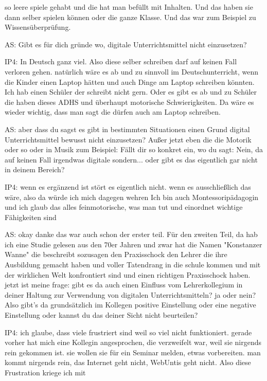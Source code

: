\documentclass[fontsize=11pt,paper=a4]{scrbook}
\begin{document}
{\begin{itemize*}
so leere spiele gehabt und die hat man befüllt mit Inhalten. Und das haben sie dann selber spielen können oder die
ganze Klasse. Und das war zum Beispiel zu
Wissensüberprüfung.
\item[AS:] Gibt es für dich gründe wo, digitale Unterrichtsmittel nicht einzusetzen?
\item[IP4:] In Deutsch ganz viel.  Also diese selber
schreiben  darf auf keinen Fall
verloren gehen.
natürlich wäre es ab und zu sinnvoll
im Deutschunterricht, wenn die
Kinder einen Laptop hätten und auch Dinge am Laptop schreiben könnten. Ich hab einen
Schüler der schreibt nicht gern. Oder es gibt es ab und zu Schüler die haben
dieses ADHS und überhaupt motorische
Schwierigkeiten. Da wäre es wieder wichtig, dass man sagt
 die dürfen auch am Laptop schreiben.
 \item[AS:] aber dass du sagst
es gibt in bestimmten Situationen einen Grund
digital Unterrichtsmittel bewusst nicht
einzusetzen? Außer jetzt eben
die die Motorik oder so oder in Musik zum Beispiel: Fällt dir so konkret ein, wo du sagt: Nein, da auf keinen Fall irgendwas digitale
sondern... oder gibt es das eigentlich gar
nicht in deinem Bereich?
\item[IP4:]
 wenn es
ergänzend ist stört es eigentlich nicht.
wenn es ausschließlich das wäre, also da würde ich mich dagegen wehren Ich bin auch
Montessoripädagogin und ich glaub das alles
feinmotorische, was man tut und
einordnet wichtige
Fähigkeiten sind
\item[AS:]okay danke das war auch schon der erster teil. Für den zweiten Teil, da hab ich eine Studie gelesen aus den
70er Jahren und zwar hat die
Namen "Konstanzer Wanne" die beschreibt
sozusagen den Praxisschock den Lehrer
die ihre Ausbildung gemacht haben
und voller Tatendrang in die schule
kommen und mit der wirklichen Welt konfrontiert sind und einen
richtigen Praxisschock
haben. 
jetzt ist meine frage: gibt es da auch einen Einfluss vom Lehrerkollegium in deiner
Haltung zur Verwendung von digitalen Unterrichtsmitteln? ja oder nein? Also
gibt's da grundsätzlich im Kollegen
positive Einstellung oder eine negative
Einstellung oder kannst du das deiner
Sicht nicht beurteilen?
\item[IP4:] ich glaube, dass
viele frustriert sind weil so viel nicht
funktioniert. gerade vorher hat mich eine
Kollegin angesprochen, die verzweifelt war, weil sie nirgends rein gekommen ist. sie wollen sie für ein 
Seminar melden, etwas vorbereiten.
man kommt nirgends rein, das Internet geht
nicht, WebUntis geht nicht. Also diese Frustration kriege ich mit

\end{itemize*}}
\end{document}
